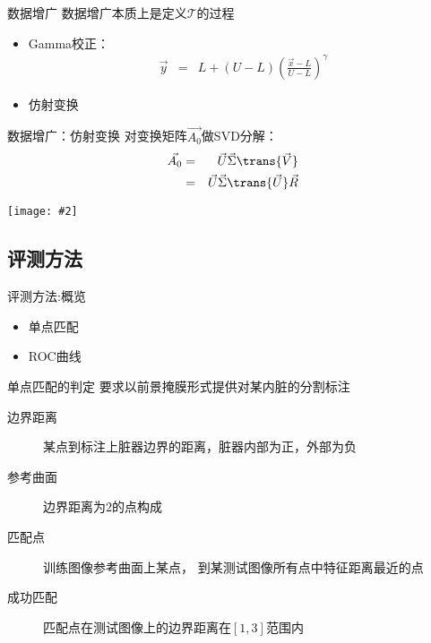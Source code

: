 \documentclass {beamer}
\newcommand{\addgraph}[2]{\begin{center}
\texttt{[image: \#2]}\end{center}}
\begin{document}
\begin{frame}{数据增广}
    数据增广本质上是定义$\mathcal{T}$的过程

    \begin{itemize}
        \item Gamma校正：
            \begin{eqnarray}
                \vec{y} &=& L + (U-L)\left(\frac{\vec{x}-L}{U-L}\right)^\gamma
            \end{eqnarray}
        \item 仿射变换
    \end{itemize}
\end{frame}

\begin{frame}{数据增广：仿射变换}
    对变换矩阵$\vec{A_0}$做SVD分解：
    \begin{eqnarray}
        \vec{A_0} &=&  \vec{U}\vec{\Sigma}\trans{\vec{V}} \nonumber \\
            &=& \vec{U}\vec{\Sigma}\trans{\vec{U}}\vec{R}
    \end{eqnarray}
    \addgraph{0.75}{res/affine-eg.png}
\end{frame}


\subsection{评测方法}
\begin{frame}{评测方法:概览}
    \begin{itemize}
        \item 单点匹配
        \item ROC曲线
    \end{itemize}
\end{frame}

\begin{frame}{单点匹配的判定}
    要求以前景掩膜形式提供对某内脏的分割标注
    \begin{description}
        \item[边界距离] 某点到标注上脏器边界的距离，脏器内部为正，外部为负
        \item[参考曲面] 边界距离为$2$的点构成
        \item[匹配点] 训练图像参考曲面上某点，
            到某测试图像所有点中特征距离最近的点
        \item[成功匹配] 匹配点在测试图像上的边界距离在$[1, 3]$范围内
    \end{description}
\end{frame}
\end{document}
